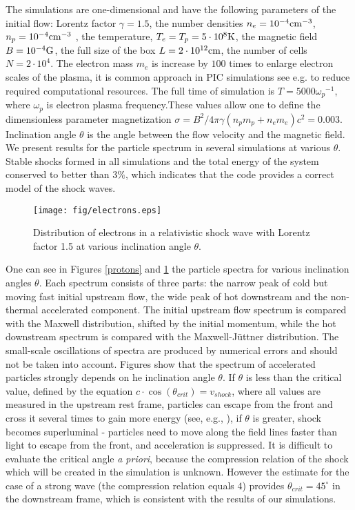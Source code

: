 \documentclass[a4paper]{jpconf}
\begin{document}
The simulations are one-dimensional and have the following parameters of the initial flow: Lorentz factor $\gamma = 1.5$, the number densities $n_e = 10^{-4} \rm{cm}^{-3}$, $n_p = 10^{-4} \rm{cm}^{-3}$ , the temperature, $T_e = T_p = 5\cdot10^8 \rm{K}$, the magnetic field $B = 10^{-4} \rm{G}$, the full size of the box $L = 2\cdot10^{12} \rm{cm}$, the number of cells $N=2\cdot10^4$. The electron mass $m_e$ is increase by $100$ times to enlarge electron scales of  the plasma, it is common approach in PIC simulations see e.g. {\cite{Sironi2011}} to reduce required computational resources. The full time of simulation is $T = 5000 {\omega_p}^{-1}$, where $\omega_p$ is electron plasma frequency.These values allow one to define the dimensionless parameter magnetization $\sigma = B^2/4\pi\gamma (n_p m_p + n_e m_e) c^2 = 0.003$. Inclination angle $\theta$ is the angle between the flow velocity and the magnetic field. We present results for the particle spectrum in several simulations at various $\theta$. Stable shocks formed in all simulations and the total energy of the system conserved to better than $3\%$, which indicates that the code provides a correct model of the shock waves. 


\begin{figure}[h!]
	\centering
	\texttt{[image: fig/electrons.eps]} 
	\caption{Distribution of electrons in a relativistic shock wave with Lorentz factor 1.5 at various inclination angle $\theta$.}
	\label{electrons}
\end{figure}

One can see in Figures \ref{protons} and \ref{electrons} the particle spectra for various inclination angles $\theta$. Each spectrum consists of three parts: the narrow peak of cold but moving fast initial upstream flow, the wide peak of hot downstream and the non-thermal accelerated component. The initial upstream flow spectrum is compared with the Maxwell distribution, shifted by the initial momentum, while the hot downstream spectrum is compared with the Maxwell-J{\"u}ttner distribution.  The small-scale oscillations of spectra are produced by numerical errors and should not be taken into account. Figures show that the spectrum of accelerated particles strongly depends on he inclination angle $\theta$. If $\theta$ is less than the critical value, defined by the equation $c\cdot \cos(\theta_{crit})=v_{shock}$, where all values are measured in the upstream rest frame, particles can escape from the front and cross it several times to gain more energy (see, e.g., \cite{Pelletier2017}), if $\theta$ is greater, shock becomes superluminal - particles need to move along the field lines faster than light to escape from the front, and acceleration is suppressed. It is difficult to evaluate the critical angle \textit{a priori}, because the compression relation of the shock which will be created in the simulation is unknown. However the estimate for the case of a strong wave (the compression relation equals $4$) provides $\theta_{crit}=45^{\circ}$ in the downstream frame, which is consistent with the results of our simulations.
\end{document}
